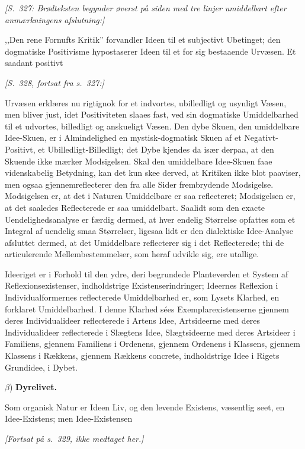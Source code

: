 \documentclass[12pt,a4paper]{article}
\begin{document}
\noindent\textit{[S.\ 327: Brødteksten begynder øverst på siden
med tre linjer umiddelbart efter anmærkningens afslutning:]}

\medskip

\noindent ,,Den rene Fornufts Kritik'' forvandler Ideen til et
subjectivt Ubetinget; den dogmatiske Positivisme hypostaserer
Ideen til et for sig bestaaende Urvæsen. Et saadant positivt

\medskip
\noindent\textit{[S.\ 328, fortsat fra s.\ 327:]}

\medskip

\noindent Urvæsen erklæres nu rigtignok for et indvortes,
ubilledligt og usynligt Væsen, men bliver just, idet Positiviteten
slaaes fast, ved sin dogmatiske Umiddelbarhed til et udvortes,
billedligt og anskueligt Væsen. Den dybe Skuen, den umiddelbare
Idee-Skuen, er i Almindelighed en mystisk-dogmatisk Skuen af et
Negativt-Positivt, et Ubilledligt-Billedligt; det Dybe kjendes da
især derpaa, at den Skuende ikke mærker Modsigelsen. Skal den
umiddelbare Idee-Skuen faae videnskabelig Betydning, kan det kun
skee derved, at Kritiken ikke blot paaviser, men ogsaa
gjennemreflecterer den fra alle Sider frembrydende Modsigelse.
Modsigelsen er, at det i Naturen Umiddelbare er saa reflecteret;
Modsigelsen er, at det saaledes Reflecterede er saa umiddelbart.
Saalidt som den exacte Uendelighedsanalyse er færdig dermed, at
hver endelig Størrelse opfattes som et Integral af uendelig smaa
Størrelser, ligesaa lidt er den dialektiske Idee-Analyse afsluttet
dermed, at det Umiddelbare reflecterer sig i det Reflecterede; thi
de articulerende Mellembestemmelser, som heraf udvikle sig, ere
utallige.

Ideeriget er i Forhold til den ydre, deri begrundede Planteverden
et System af Reflexionsexistenser, indholdstrige
Existenserindringer; Ideernes Reflexion i Individualformernes
reflecterede Umiddelbarhed er, som Lysets Klarhed, en forklaret
Umiddelbarhed. I denne Klarhed sées Exemplarexistenserne gjennem
deres Individualideer reflecterede i Artens Idee, Artsideerne med
deres Individualideer reflecterede i Slægtens Idee, Slægtsideerne
med deres Artsideer i Familiens, gjennem Familiens i Ordenens,
gjennem Ordenens i Klassens, gjennem Klassens i Rækkens, gjennem
Rækkens concrete, indholdstrige Idee i Rigets Grundidee, i Dybet.

\medskip
\noindent $\beta$) \textbf{Dyrelivet.}

Som organisk Natur er Ideen Liv, og den levende Existens,
væsentlig seet, en Idee-Existens; men Idee-Existensen

\medskip
\noindent\textit{[Fortsat på s.\ 329, ikke medtaget her.]}
\end{document}

